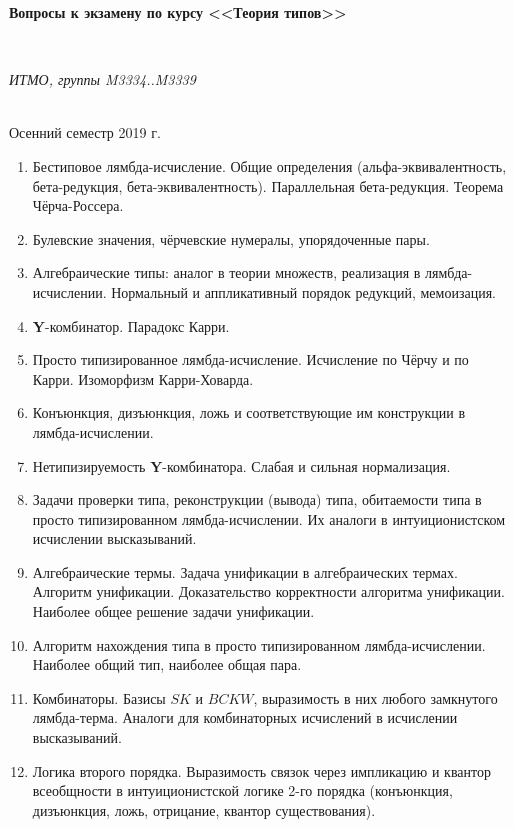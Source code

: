 \documentclass[11pt,a4paper,oneside]{article}
\begin{document}
\begin{center}
\begin{Large}{\bfseries Вопросы к экзамену по курсу <<Теория типов>>}\end{Large}\\
\vspace{1mm}
\begin{small} \itshape ИТМО, группы M3334..M3339\end{small}\\
\small Осенний семестр 2019 г.
\end{center}

\begin{enumerate}
\item Бестиповое лямбда-исчисление. Общие определения (альфа-эквивалентность, бета-редукция, бета-эквивалентность).
Параллельная бета-редукция. Теорема Чёрча-Россера.
\item Булевские значения, чёрчевские нумералы, упорядоченные пары.
\item Алгебраические типы: аналог в теории множеств, реализация в лямбда-исчислении. 
Нормальный и аппликативный порядок редукций, мемоизация.
\item \textbf{Y}-комбинатор. Парадокс Карри.
\item Просто типизированное лямбда-исчисление. Исчисление по Чёрчу и по Карри. Изоморфизм Карри-Ховарда.
\item Конъюнкция, дизъюнкция, ложь и соответствующие им конструкции в лямбда-исчислении.
\item Нетипизируемость \textbf{Y}-комбинатора. Слабая и сильная нормализация.
\item Задачи проверки типа, реконструкции (вывода) типа, обитаемости типа в просто типизированном лямбда-исчислении.
Их аналоги в интуиционистском исчислении высказываний.
\item Алгебраические термы. Задача унификации в алгебраических термах. Алгоритм унификации. Доказательство 
корректности алгоритма унификации. Наиболее общее решение задачи унификации.
\item Алгоритм нахождения типа в просто типизированном лямбда-исчислении. Наиболее общий тип, наиболее общая пара.
\item Комбинаторы. Базисы $SK$ и $BCKW$, выразимость в них любого замкнутого лямбда-терма.
Аналоги для комбинаторных исчислений в исчислении высказываний.
\item Логика второго порядка. Выразимость связок через импликацию и квантор всеобщности в интуиционистской логике 
2-го порядка (конъюнкция, дизъюнкция, ложь, отрицание, квантор существования).

\end{enumerate}
\end{document}

